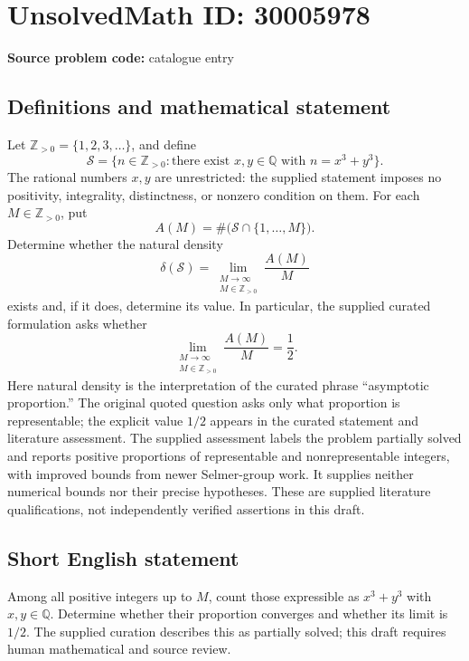 \documentclass[11pt]{article}
\newcommand{\Z}{\mathbb{Z}}
\newcommand{\Q}{\mathbb{Q}}
\begin{document}
\section*{UnsolvedMath ID: 30005978}
\textbf{Source problem code:} catalogue entry
\subsection{Definitions and mathematical statement}
Let \(\Z_{>0}=\{1,2,3,\ldots\}\), and define
\[
\mathcal S=\{n\in\Z_{>0}:\text{there exist }x,y\in\Q\text{ with }n=x^3+y^3\}.
\]
The rational numbers \(x,y\) are unrestricted: the supplied statement imposes no positivity, integrality, distinctness, or nonzero condition on them. For each \(M\in\Z_{>0}\), put
\[
A(M)=\#\bigl(\mathcal S\cap\{1,\ldots,M\}\bigr).
\]
Determine whether the natural density
\[
\delta(\mathcal S)=\lim_{\substack{M\to\infty\\M\in\Z_{>0}}}\frac{A(M)}{M}
\]
exists and, if it does, determine its value. In particular, the supplied curated formulation asks whether
\[
\lim_{\substack{M\to\infty\\M\in\Z_{>0}}}\frac{A(M)}{M}=\frac12.
\]
Here natural density is the interpretation of the curated phrase ``asymptotic proportion.'' The original quoted question asks only what proportion is representable; the explicit value \(1/2\) appears in the curated statement and literature assessment. The supplied assessment labels the problem partially solved and reports positive proportions of representable and nonrepresentable integers, with improved bounds from newer Selmer-group work. It supplies neither numerical bounds nor their precise hypotheses. These are supplied literature qualifications, not independently verified assertions in this draft.
\subsection{Short English statement}
Among all positive integers up to \(M\), count those expressible as \(x^3+y^3\) with \(x,y\in\Q\). Determine whether their proportion converges and whether its limit is \(1/2\). The supplied curation describes this as partially solved; this draft requires human mathematical and source review.
\end{document}
